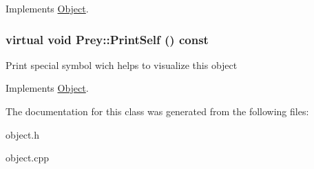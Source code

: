 Implements \hyperlink{classObject_a27d03e80827229de2ce885a0bc1c83c0}{Object}.

\hypertarget{classPrey_a46d5447bf01e734154f8d3f2f27c8fcd}{
\subsubsection[{PrintSelf}]{\setlength{\rightskip}{0pt plus 5cm}virtual void Prey::PrintSelf () const}}
\label{classPrey_a46d5447bf01e734154f8d3f2f27c8fcd}
Print special symbol wich helps to visualize this object 

Implements \hyperlink{classObject_a2c63e79dfa8626451b4a04b0b72294eb}{Object}.



The documentation for this class was generated from the following files:\begin{DoxyCompactItemize}
\item 
object.h\item 
object.cpp\end{DoxyCompactItemize}
